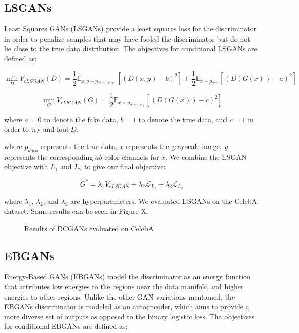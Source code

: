 \documentclass[10pt]{article}
\begin{document}

\subsection{LSGANs}
Least Squares GANs (LSGANs) provide a least squares loss for the discriminator in order to penalize samples
that may have fooled the discriminator but do not lie close to the true data distribution. The objectives
for conditional LSGANs are defined as:

\[\min\limits_{D} V_{cLSGAN}(D) = \frac{1}{2} \mathbb{E}_{x,y \sim p_{data(x,y)}} [(D(x,y)-b) ^2] +
\frac{1}{2} \mathbb{E}_{x \sim p_{data}}[(D(G(x)) - a)^2] \]

\[\min\limits_{G} V_{cLSGAN}(G) = \frac{1}{2} \mathbb{E}_{x \sim p_{data(x)}} [(D(G(x))-c)^2] \]

\noindent where $a=0$ to denote the fake data, $b=1$ to denote the true data, and $c=1$ in order to try and
fool $D$. 

\noindent where $p_{data}$ represents the true data, $x$ represents the grayscale image, $y$ represents
the corresponding $ab$ color channels for $x$. 
We combine the LSGAN objective with $L_1$ and $L_2$ to give our final objective:

\[ G^* = \lambda_1 V_{cLSGAN} + \lambda_2 \mathcal{L}_{L_1} + \lambda_3 \mathcal{L}_{L_2} \]

\noindent where $\lambda_1$, $\lambda_2$, and $\lambda_3$ are hyperparameters. We evaluated LSGANs on
the CelebA dataset. Some results can be seen in Figure X.

\begin{figure}[h]
   \centering
   \caption{Results of DCGANs evaluated on CelebA}
   \label{fi}
\end{figure}  

\subsection{EBGANs}
Energy-Based GANs (EBGANs) model the discriminator as an energy function that attributes low energies to
the regions near the data manifold and higher energies to other regions. Unlike the other GAN variations
mentioned, the EBGANs discriminator is modeled as an autoencoder, which aims to provide a more diverse
set of outputs as opposed to the binary logistic loss. 
The objectives for conditional EBGANs are defined as:
\end{document}
